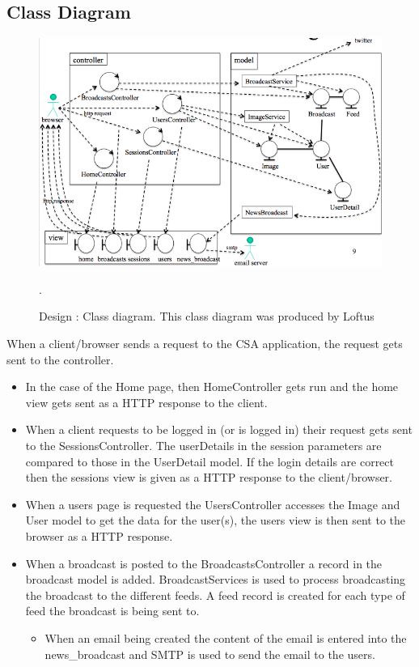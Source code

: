 \documentclass[10pt,a4paper,titlepage]{article}
\begin{document}
\subsection{Class Diagram}
\begin{figure}[H]
\begin{center}
\includegraphics[scale=0.55]{include/classDiagram.png}  
\caption{Design : Class diagram. This class diagram was produced by Loftus\cite[5]{design}}.
\label{fig:classDiagram}
\end{center}
\end{figure}
When a client/browser sends a request to the CSA application, the request gets sent to the controller. 
\begin{itemize}
\item In the case of the Home page, then HomeController gets run and the home view gets sent as a HTTP response to the client. 
\item When a client requests to be logged in (or is logged in) their request gets sent to the SessionsController. The userDetails in the session parameters are compared to those in the UserDetail model. If the login details are correct then the sessions view is given as a HTTP response to the client/browser. 
\item When a users page is requested the UsersController accesses the Image and User model to get the data for the user(s), the users view is then sent to the browser as a HTTP response. 
\item When a broadcast is posted to the BroadcastsController a record in the broadcast model is added. BroadcastServices is used to process broadcasting the broadcast to the different feeds. A feed record is created for each type of feed the broadcast is being sent to. 
	\begin{itemize}
	\item When an email being created the content of the email is entered into the news\_broadcast and SMTP is used to send the email to the users.
	\end{itemize}
	
\end{itemize}
\end{document}
